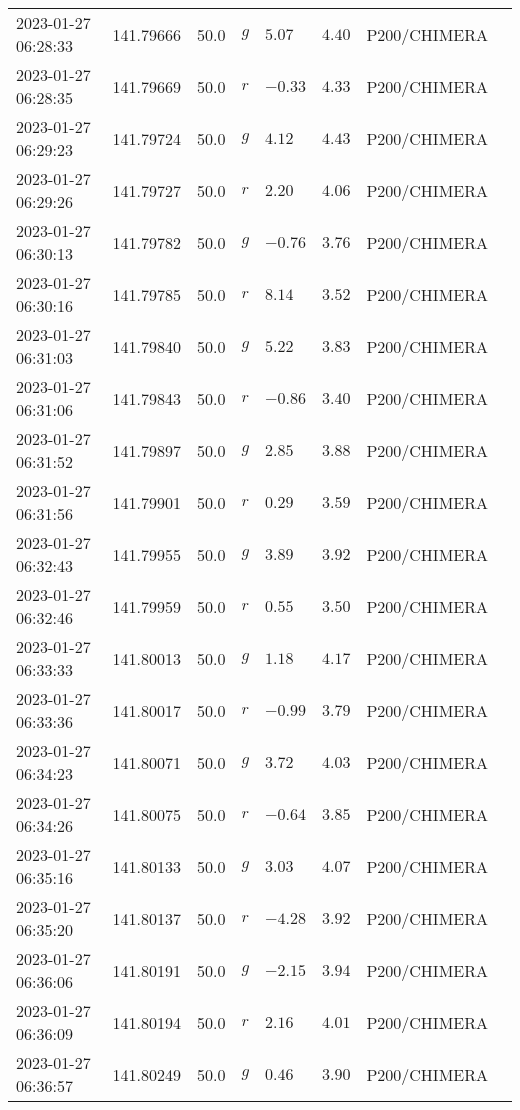 \documentclass{nature_plusfigure}
\begin{document}
\begin{supplement}
\begin{center}
\begin{longtable}{llllllll}
2023-01-27 06:28:33 & 141.79666 & 50.0 & $g$ & $5.07$ & $4.40$ & P200/CHIMERA &  \\ 
2023-01-27 06:28:35 & 141.79669 & 50.0 & $r$ & $-0.33$ & $4.33$ & P200/CHIMERA &  \\ 
2023-01-27 06:29:23 & 141.79724 & 50.0 & $g$ & $4.12$ & $4.43$ & P200/CHIMERA &  \\ 
2023-01-27 06:29:26 & 141.79727 & 50.0 & $r$ & $2.20$ & $4.06$ & P200/CHIMERA &  \\ 
2023-01-27 06:30:13 & 141.79782 & 50.0 & $g$ & $-0.76$ & $3.76$ & P200/CHIMERA &  \\ 
2023-01-27 06:30:16 & 141.79785 & 50.0 & $r$ & $8.14$ & $3.52$ & P200/CHIMERA &  \\ 
2023-01-27 06:31:03 & 141.79840 & 50.0 & $g$ & $5.22$ & $3.83$ & P200/CHIMERA &  \\ 
2023-01-27 06:31:06 & 141.79843 & 50.0 & $r$ & $-0.86$ & $3.40$ & P200/CHIMERA &  \\ 
2023-01-27 06:31:52 & 141.79897 & 50.0 & $g$ & $2.85$ & $3.88$ & P200/CHIMERA &  \\ 
2023-01-27 06:31:56 & 141.79901 & 50.0 & $r$ & $0.29$ & $3.59$ & P200/CHIMERA &  \\ 
2023-01-27 06:32:43 & 141.79955 & 50.0 & $g$ & $3.89$ & $3.92$ & P200/CHIMERA &  \\ 
2023-01-27 06:32:46 & 141.79959 & 50.0 & $r$ & $0.55$ & $3.50$ & P200/CHIMERA &  \\ 
2023-01-27 06:33:33 & 141.80013 & 50.0 & $g$ & $1.18$ & $4.17$ & P200/CHIMERA &  \\ 
2023-01-27 06:33:36 & 141.80017 & 50.0 & $r$ & $-0.99$ & $3.79$ & P200/CHIMERA &  \\ 
2023-01-27 06:34:23 & 141.80071 & 50.0 & $g$ & $3.72$ & $4.03$ & P200/CHIMERA &  \\ 
2023-01-27 06:34:26 & 141.80075 & 50.0 & $r$ & $-0.64$ & $3.85$ & P200/CHIMERA &  \\ 
2023-01-27 06:35:16 & 141.80133 & 50.0 & $g$ & $3.03$ & $4.07$ & P200/CHIMERA &  \\ 
2023-01-27 06:35:20 & 141.80137 & 50.0 & $r$ & $-4.28$ & $3.92$ & P200/CHIMERA &  \\ 
2023-01-27 06:36:06 & 141.80191 & 50.0 & $g$ & $-2.15$ & $3.94$ & P200/CHIMERA &  \\ 
2023-01-27 06:36:09 & 141.80194 & 50.0 & $r$ & $2.16$ & $4.01$ & P200/CHIMERA &  \\ 
2023-01-27 06:36:57 & 141.80249 & 50.0 & $g$ & $0.46$ & $3.90$ & P200/CHIMERA &  \\ 

\end{longtable}
\end{center}
\end{supplement}
\end{document}
